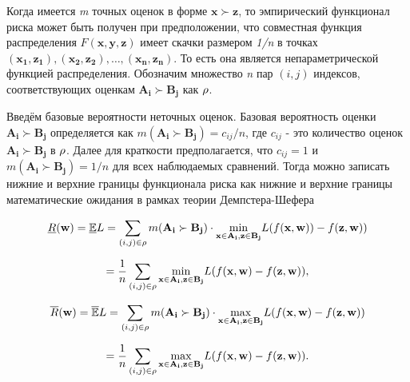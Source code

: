 \documentclass[12pt,a4paper,oneside]{article}
\begin{document}
\par 
Когда имеется \emph{m} точных оценок в форме \(\mathbf{x} \succ \mathbf{z}\), то эмпирический функционал риска может быть получен при предположении, что совместная функция распределения \(F(\mathbf{x}, \mathbf{y}, \mathbf{z})\) имеет скачки размером \emph{1/n} в точках \((\mathbf{x_1}, \mathbf{z_1}), (\mathbf{x_2}, \mathbf{z_2}), \dots, (\mathbf{x_n}, \mathbf{z_n})\). 
То есть она является непараметрической функцией распределения. 
Обозначим множество \emph{n} пар \((i, j)\) индексов, соответствующих оценкам \(\mathbf{A_i} \succ \mathbf{B_j}\) как \(\mathrm{\rho}\). 

\par
Введём базовые вероятности неточных оценок. 
Базовая вероятность оценки \(\mathbf{A_i} \succ \mathbf{B_j}\) определяется как \(m(\mathbf{A_i} \succ \mathbf{B_j}) = c_{ij} / n\), где \(c_{ij}\) - это количество оценок \(\mathbf{A_i} \succ \mathbf{B_j}\) в \(\mathrm{\rho}\). 
Далее для краткости предполагается, что \(c_{ij} = 1\) и \(m(\mathbf{A_i} \succ \mathbf{B_j}) = 1/n\) для всех наблюдаемых сравнений. 
Тогда можно записать нижние и верхние границы функционала риска как нижние и верхние границы математические ожидания в рамках теории Демпстера-Шефера

\[
\underline{R}(\mathbf{w}) = \mathbb{\underline{E}}L = \sum \limits_{(i,j) \in \Rho} m(\mathbf{A_i} \succ \mathbf{B_j}) \cdot \underset{%
	\mathbf{x} \in \mathbf{A_i}, \mathbf{z} \in \mathbf{B_j}%
}{\operatorname{min}} %
L(f(\mathbf{x}, \mathbf{w})) - f(\mathbf{z}, \mathbf{w}))
\]

\[
= \frac{1}{n} \sum \limits_{(i,j) \in \Rho} \underset{%
\mathbf{x} \in \mathbf{A_i}, \mathbf{z} \in \mathbf{B_j}%
}{\operatorname{min}}%
L(f(\mathbf{x}, \mathbf{w}) - f(\mathbf{z}, \mathbf{w})),
\]

\[
\overline{R}(\mathbf{w}) = \mathbb{\overline{E}} L = \sum \limits_{(i,j) \in \Rho} m(\mathbf{A_i} \succ \mathbf{B_j}) \cdot \underset{%
	\mathbf{x} \in \mathbf{A_i}, \mathbf{z} \in \mathbf{B_j}%
}{\operatorname{max}}
L (f (\mathbf{x}, \mathbf{w}) - f(\mathbf{z}, \mathbf{w}))
\]

\[
= \frac{1}{n} \sum \limits_{(i,j) \in \Rho} \underset{%
	\mathbf{x} \in \mathbf{A_i}, \mathbf{z} \in \mathbf{B_j}%
}{\operatorname{max}}%
L (f(\mathbf{x}, \mathbf{w}) - f(\mathbf{z}, \mathbf{w})).
\]
\end{document}
